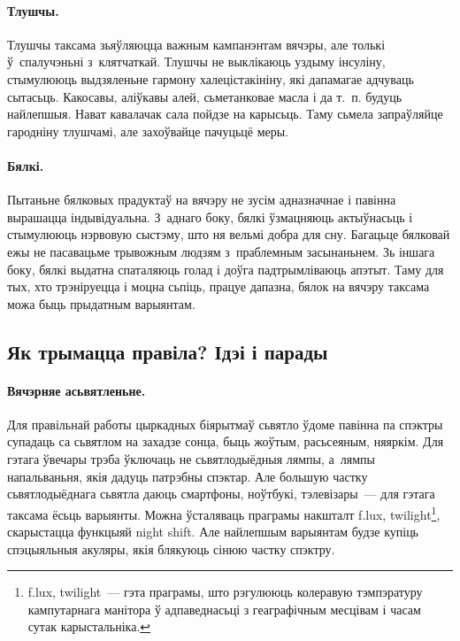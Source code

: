 \paragraph{Тлушчы.}
Тлушчы таксама зьяўляюцца важным кампанэнтам вячэры, але толькі ў~спалучэньні з~клятчаткай. Тлушчы не выклікаюць уздыму інсуліну, стымулююць выдзяленьне гармону халецістакініну, які дапамагае адчуваць сытасьць. Какосавы, аліўкавы алей, сьметанковае масла і да т.~п. будуць найлепшыя. Нават кавалачак сала пойдзе на карысьць. Таму сьмела запраўляйце гародніну тлушчамі, але захоўвайце пачуцьцё меры.


\paragraph{Бялкі.}
Пытаньне бялковых прадуктаў на вячэру не зусім адназначнае і павінна вырашацца індывідуальна. З~аднаго боку, бялкі ўзмацняюць актыўнасьць і стымулююць нэрвовую сыстэму, што ня вельмі добра для сну. Багацьце бялковай ежы не пасавацьме трывожным людзям з~праблемным засынаньнем. Зь іншага боку, бялкі выдатна спаталяюць голад і доўга падтрымліваюць апэтыт. Таму для тых, хто трэніруецца і моцна сьпіць, працуе дапазна, бялок на вячэру таксама можа быць прыдатным варыянтам.

\subsection{Як трымацца правіла? Ідэі і парады}

\paragraph{Вячэрняе асьвятленьне.}
Для правільнай работы цыркадных біярытмаў сьвятло ўдоме павінна па спэктры супадаць са сьвятлом на захадзе сонца, быць жоўтым, расьсеяным, няяркім. Для гэтага ўвечары трэба ўключаць не сьвятлодыёдныя лямпы, а~лямпы напальваньня, якія дадуць патрэбны спэктар. Але большую частку сьвятлодыёднага сьвятла даюць смартфоны, ноўтбукі, тэлевізары~--- для гэтага таксама ёсьць варыянты. Можна ўсталяваць праграмы накшталт f.lux, twilight\footnote{f.lux, twilight~--- гэта праграмы, што рэгулююць колеравую тэмпэратуру кампутарнага манітора ў адпаведнасьці з геаграфічным месцівам і часам сутак карыстальніка.}, скарыстацца функцыяй night shift. Але найлепшым варыянтам будзе купіць спэцыяльныя акуляры, якія блякуюць сінюю частку спэктру.

